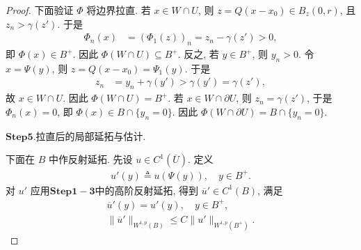 \documentclass[../../main.tex]{subfiles}
\begin{document}
\begin{proof}
下面验证 \(\Phi\) 将边界拉直. 若 \(x \in W \cap U\), 则 \(z = Q(x - x_0) \in B_z(0, r)\), 且 \(z_n > \gamma(z')\). 于是
\begin{align*}
\Phi_n(x) &= (\Phi_1(z))_n = z_n - \gamma(z') > 0,
\end{align*}
即 \(\Phi(x) \in B^+\). 因此 \(\Phi(W \cap U) \subseteq B^+\). 反之, 若 \(y \in B^+\), 则 \(y_n > 0\). 令 \(x = \Psi(y)\), 则 \(z = Q(x - x_0) = \Psi_1(y)\). 于是
\begin{align*}
z_n &= y_n + \gamma(y') > \gamma(y') = \gamma(z'),
\end{align*}
故 \(x \in W \cap U\). 因此 \(\Phi(W \cap U) = B^+\). 若 \(x \in W \cap \partial U\), 则 \(z_n = \gamma(z')\), 于是 \(\Phi_n(x) = 0\), 即 \(\Phi(x) \in B \cap \{y_n = 0\}\). 因此 \(\Phi(W \cap \partial U) = B \cap \{y_n = 0\}\).

\noindent$\mathbf{Step}\bm{5}$.{\heiti 拉直后的局部延拓与估计.}

下面在 \(B\) 中作反射延拓. 先设 \(u \in C^1(\overline{U})\). 定义
\begin{align*}
u'(y) \triangleq u(\Psi(y)), \quad y \in B^+.
\end{align*}
对 \(u'\) 应用$\mathbf{Step}\bm{1-3}$中的高阶反射延拓, 得到 \(\overline{u}' \in C^1(B)\), 满足
\begin{gather}
\overline{u}'(y) = u'(y), \quad y \in B^+, \label{eq:ch05-ext-in-ball-1} \\
\|\overline{u}'\|_{W^{1,p}(B)} \leqslant C \|u'\|_{W^{1,p}(B^+)}. \label{eq:ch05-ext-in-ball-2}
\end{gather}


\end{proof}
\end{document}
